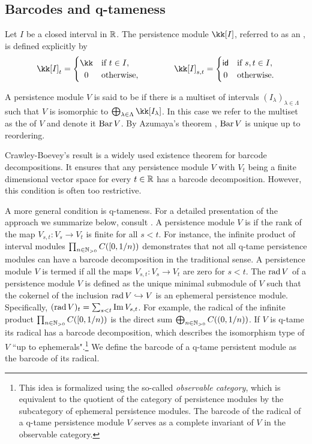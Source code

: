 \subsection{Barcodes and q-tameness}

Let $I$ be a closed interval in $\mathbb{R}$.
The persistence module $\kk[I]$, referred to as an , is defined explicitly by
\[
\kk[I]_t =
\begin{cases}
	\kk & \text{if } t \in I, \\
	\hfil 0 & \text{otherwise},
\end{cases}
\qquad \qquad
\kk[I]_{s, t} =
\begin{cases}
	\id & \text{if } s, t \in I, \\
	\hfil 0 & \text{otherwise}.
\end{cases}
\]

A persistence module $V$ is said to be  if there is a multiset of intervals $(I_\lambda)_{\lambda \in \Lambda}$ such that $V$ is isomorphic to $\bigoplus_{\lambda \in \Lambda} \kk[I_\lambda]$.
In this case we refer to the multiset as the  of $V$ and denote it $\operatorname{Bar} V$.
By Azumaya’s theorem \cite{azumaya1950theorem}, $\operatorname{Bar} V$ is unique up to reordering.

Crawley-Boevey's result \cite{Crawley-Boevey.2015} is a widely used existence theorem for barcode decompositions.
It ensures that any persistence module \(V\) with \(V_t\) being a finite dimensional vector space for every \(t \in \mathbb{R}\) has a barcode decomposition.
However, this condition is often too restrictive.

A more general condition is q-tameness.
For a detailed presentation of the approach we summarize below, consult \cite{Chazal.2016a, Chazal.2016b}.
A persistence module \(V\) is  if the rank of the map \(V_{s,t} \colon V_s \to V_t\) is finite for all \(s < t\).
For instance, the infinite product of interval modules \(\prod_{n \in \mathbb{N}_{> 0}} C([0,1/n))\) demonstrates that not all q-tame persistence modules can have a barcode decomposition in the traditional sense.
A persistence module \(V\) is termed  if all the maps \(V_{s,t} \colon V_s \to V_t\) are zero for \(s < t\).
The  \(\operatorname{rad} V\) of a persistence module \(V\) is defined as the unique minimal submodule of \(V\) such that the cokernel of the inclusion \(\operatorname{rad} V \hookrightarrow V\) is an ephemeral persistence module.
Specifically, \((\operatorname{rad} V)_t = \sum_{s<t} \operatorname{Im} V_{s,t}\).
For example, the radical of the infinite product \(\prod_{n \in \mathbb{N}_{> 0}} C([0, 1/n))\) is the direct sum \(\bigoplus_{n \in \mathbb{N}_{> 0}} C((0,1/n))\).
If \(V\) is q-tame its radical has a barcode decomposition, which describes the isomorphism type of \(V\) ``up to ephemerals".\footnote{
This idea is formalized using the so-called \textit{observable category}, which is equivalent to the quotient of the category of persistence modules by the subcategory of ephemeral persistence modules.
The barcode of the radical of a q-tame persistence module \(V\) serves as a complete invariant of \(V\) in the observable category.}
We define the barcode of a q-tame persistent module as the barcode of its radical.

